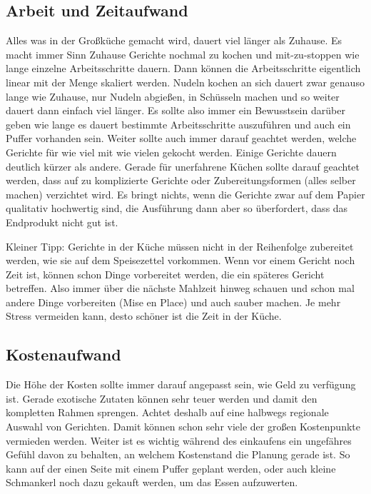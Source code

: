 \subsection{Arbeit und Zeitaufwand}\label{subsec:arbeits-und-zeitaufwand}
Alles was in der Großküche gemacht wird, dauert viel länger als Zuhause.
Es macht immer Sinn Zuhause Gerichte nochmal zu kochen und mit-zu-stoppen wie lange einzelne Arbeitsschritte dauern.
Dann können die Arbeitsschritte eigentlich linear mit der Menge skaliert werden.
Nudeln kochen an sich dauert zwar genauso lange wie Zuhause, nur Nudeln abgießen, in Schüsseln machen und so weiter dauert dann einfach viel länger.
Es sollte also immer ein Bewusstsein darüber geben wie lange es dauert bestimmte Arbeitsschritte auszuführen und auch ein Puffer vorhanden sein.
Weiter sollte auch immer darauf geachtet werden, welche Gerichte für wie viel mit wie vielen gekocht werden.
Einige Gerichte dauern deutlich kürzer als andere.
Gerade für unerfahrene Küchen sollte darauf geachtet werden, dass auf zu komplizierte Gerichte oder Zubereitungsformen (alles selber machen) verzichtet wird.
Es bringt nichts, wenn die Gerichte zwar auf dem Papier qualitativ hochwertig sind, die Ausführung dann aber so überfordert, dass das Endprodukt nicht gut ist.

Kleiner Tipp: Gerichte in der Küche müssen nicht in der Reihenfolge zubereitet werden, wie sie auf dem Speisezettel vorkommen.
Wenn vor einem Gericht noch Zeit ist, können schon Dinge vorbereitet werden, die ein späteres Gericht betreffen.
Also immer über die nächste Mahlzeit hinweg schauen und schon mal andere Dinge vorbereiten (Mise en Place) und auch sauber machen.
Je mehr Stress vermeiden kann, desto schöner ist die Zeit in der Küche.

\subsection{Kostenaufwand}\label{subsec:kostenaufwand}
Die Höhe der Kosten sollte immer darauf angepasst sein, wie Geld zu verfügung ist.
Gerade exotische Zutaten können sehr teuer werden und damit den kompletten Rahmen sprengen.
Achtet deshalb auf eine halbwegs regionale Auswahl von Gerichten.
Damit können schon sehr viele der großen Kostenpunkte vermieden werden.
Weiter ist es wichtig während des einkaufens ein ungefähres Gefühl davon zu behalten, an welchem Kostenstand die Planung gerade ist.
So kann auf der einen Seite mit einem Puffer geplant werden, oder auch kleine Schmankerl noch dazu gekauft werden, um das Essen aufzuwerten.

